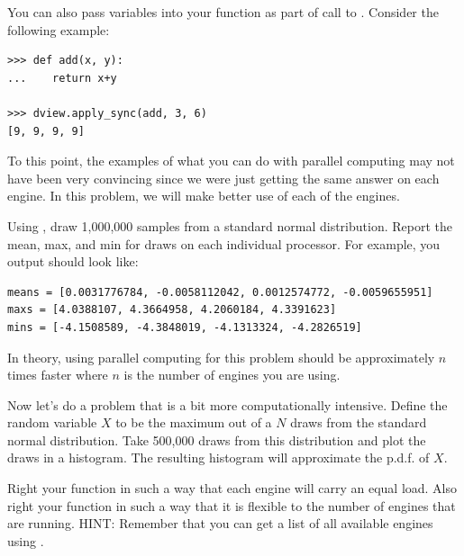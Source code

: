 You can also pass variables into your function as part of call to . Consider the following example:

\begin{lstlisting}
>>> def add(x, y):
...    return x+y

>>> dview.apply_sync(add, 3, 6)
[9, 9, 9, 9]
\end{lstlisting}

\begin{problem}
To this point, the examples of what you can do with parallel computing may not have been very convincing since we were just getting the same answer on each engine. In this problem, we will make better use of each of the engines.

Using , draw 1,000,000 samples from a standard normal distribution. Report the mean, max, and min for draws on each individual processor. For example, you output should look like:
\begin{lstlisting}
means = [0.0031776784, -0.0058112042, 0.0012574772, -0.0059655951]
maxs = [4.0388107, 4.3664958, 4.2060184, 4.3391623]
mins = [-4.1508589, -4.3848019, -4.1313324, -4.2826519]
\end{lstlisting}

In theory, using parallel computing for this problem should be approximately $n$ times faster where $n$ is the number of engines you are using.
\end{problem}

\begin{problem}
Now let's do a problem that is a bit more computationally intensive. Define the random variable $X$ to be the maximum out of a $N$ draws from the standard normal distribution. Take 500,000 draws from this distribution and plot the draws in a histogram. The resulting histogram will approximate the p.d.f. of $X$.

Right your function in such a way that each engine will carry an equal load. Also right your function in such a way that it is flexible to the number of engines that are running. HINT: Remember that you can get a list of all available engines using .
\end{problem}
